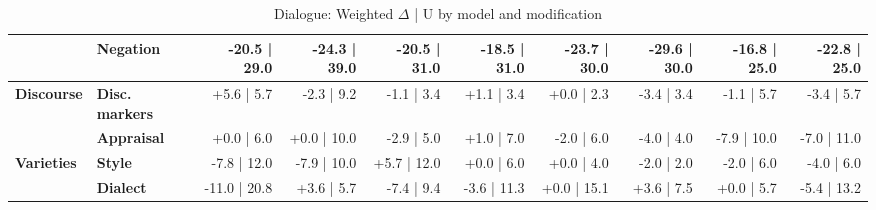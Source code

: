 \begin{table}[h]
{\begin{tabular}{llrrrrrrrr}
  & \textbf{Negation} & -20.5 | 29.0 & -24.3 | 39.0 & -20.5 | 31.0 & -18.5 | 31.0 & -23.7 | 30.0 & -29.6 | 30.0 & -16.8 | 25.0 & -22.8 | 25.0 \\
\midrule
\textbf{Discourse} & \textbf{Disc. markers} & +5.6 | 5.7 & -2.3 | 9.2 & -1.1 | 3.4 & +1.1 | 3.4 & +0.0 | 2.3 & -3.4 | 3.4 & -1.1 | 5.7 & -3.4 | 5.7 \\
  & \textbf{Appraisal} & +0.0 | 6.0 & +0.0 | 10.0 & -2.9 | 5.0 & +1.0 | 7.0 & -2.0 | 6.0 & -4.0 | 4.0 & -7.9 | 10.0 & -7.0 | 11.0 \\
\midrule
\textbf{Varieties} & \textbf{Style} & -7.8 | 12.0 & -7.9 | 10.0 & +5.7 | 12.0 & +0.0 | 6.0 & +0.0 | 4.0 & -2.0 | 2.0 & -2.0 | 6.0 & -4.0 | 6.0 \\
  & \textbf{Dialect} & -11.0 | 20.8 & +3.6 | 5.7 & -7.4 | 9.4 & -3.6 | 11.3 & +0.0 | 15.1 & +3.6 | 7.5 & +0.0 | 5.7 & -5.4 | 13.2 \\
\bottomrule
\end{tabular}}
\caption{Dialogue: Weighted $\Delta$ | U by model and modification}\label{tab:dialogue_combined}
\end{table}